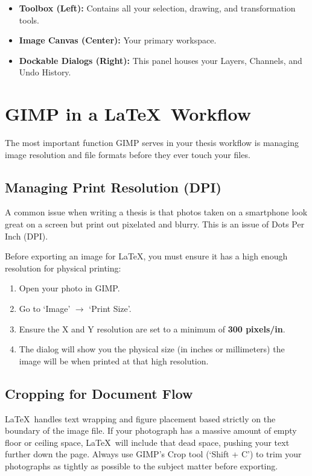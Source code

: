 			\begin{itemize}
				\item \textbf{Toolbox (Left):} Contains all your selection, drawing, and transformation tools.
				\item \textbf{Image Canvas (Center):} Your primary workspace.
				\item \textbf{Dockable Dialogs (Right):} This panel houses your Layers, Channels, and Undo History.
			\end{itemize}

	\section{GIMP in a \LaTeX\ Workflow}
		The most important function GIMP serves in your thesis workflow is managing image resolution and file formats before they ever touch your  files.

		\subsection{Managing Print Resolution (DPI)}
			A common issue when writing a thesis is that photos taken on a smartphone look great on a screen but print out pixelated and blurry. 
			This is an issue of Dots Per Inch (DPI). 
			
			Before exporting an image for \LaTeX, you must ensure it has a high enough resolution for physical printing:
			\begin{enumerate}
				\item Open your photo in GIMP.
				\item Go to `Image' \(\rightarrow\) `Print Size'.
				\item Ensure the X and Y resolution are set to a minimum of \textbf{300 pixels/in}. 
				\item The dialog will show you the physical size (in inches or millimeters) the image will be when printed at that high resolution.
			\end{enumerate}

		\subsection{Cropping for Document Flow}
			\LaTeX\ handles text wrapping and figure placement based strictly on the boundary of the image file. 
			If your photograph has a massive amount of empty floor or ceiling space, \LaTeX\ will include that dead space, pushing your text further down the page. 
			Always use GIMP's Crop tool (`Shift + C') to trim your photographs as tightly as possible to the subject matter before exporting.

